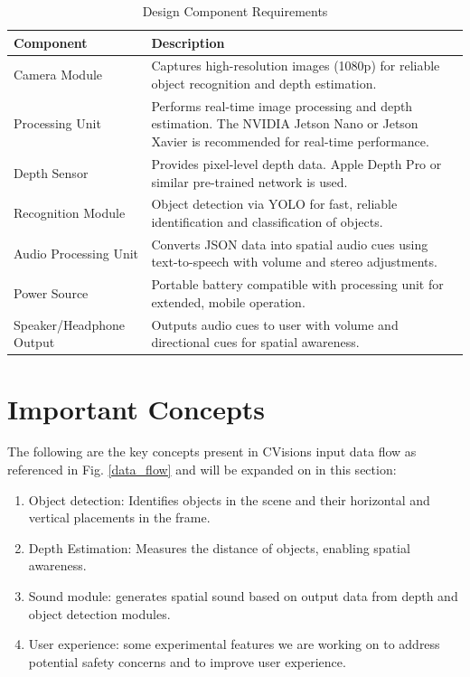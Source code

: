 \documentclass[12pt,a4paper]{article}
\begin{document}
            \begin{table}[h!]
                \centering
                    \caption{Design Component Requirements}
                \label{tab:comp_describe}
                \begin{tabular}{|l|p{10cm}|}
                \hline
                \textbf{Component} & \textbf{Description} \\ \hline
                Camera Module & Captures high-resolution images (1080p) for reliable object recognition and depth estimation. \\ \hline
                Processing Unit & Performs real-time image processing and depth estimation. The NVIDIA Jetson Nano or Jetson Xavier is recommended for real-time performance. \\ \hline
                Depth Sensor & Provides pixel-level depth data. Apple Depth Pro or similar pre-trained network is used. \\ \hline
                Recognition Module & Object detection via YOLO for fast, reliable identification and classification of objects. \\ \hline
                Audio Processing Unit & Converts JSON data into spatial audio cues using text-to-speech with volume and stereo adjustments. \\ \hline
                Power Source & Portable battery compatible with processing unit for extended, mobile operation. \\ \hline
                Speaker/Headphone Output & Outputs audio cues to user with volume and directional cues for spatial awareness. \\ \hline
                \end{tabular}
                \end{table}

\newpage
\section{Important Concepts}
The following are the key concepts present in CVisions input data flow as referenced in Fig. \ref{data_flow} and will be expanded on in this section:
\begin{enumerate}
    \item Object detection: Identifies objects in the scene and their horizontal and vertical placements in the frame.
    \item Depth Estimation: Measures the distance of objects, enabling spatial awareness.
    \item Sound module: generates spatial sound based on output data from depth and object detection modules.
    \item User experience: some experimental features we are working on to address potential safety concerns and to improve user experience.
\end{enumerate}
\end{document}
